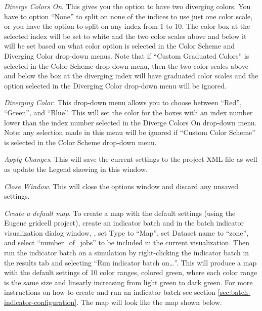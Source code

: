 \emph{Diverge Colors On}. This gives you the option to 
have two diverging colors. You have to option 
``None'' to split on none of the indices to use just one color scale, or 
you have the option to split on any index from 1 to 10. The color box at the 
selected index will be set to white and the two color scales above and 
below it will be set based on what color option is selected in the Color 
Scheme and Diverging Color drop-down menus. Note that if ``Custom Graduated Colors'' 
is selected in the Color Scheme drop-down menu, then the two color 
scales above and below the box at the diverging index will have graduated 
color scales and the option selected in the Diverging Color drop-down menu 
will be ignored.

\emph{Diverging Color}. This drop-down menu allows 
you to choose between ``Red'', ``Green'', and ``Blue''.  
This will set the color for the boxes with an index number lower than 
the index number selected in the Diverge Colors On drop-down menu.
Note: any selection made in this menu will be ignored if 
``Custom Color Scheme'' is selected in the Color Scheme drop-down menu.

\emph{Apply Changes}. This will save the current settings to 
the project XML file as well as update the Legend showing in this window.

\emph{Close Window}. This will close the options window and discard any unsaved settings.


\clearpage
{}

\emph{Create a default map}. To create a map with the default settings 
(using the Eugene gridcell project), create an indicator batch and 
in the batch indicator visualization dialog window, , set Type to 
``Map'', set Dataset name to ``zone'', and select ``number_of_jobs'' to be 
included in the current visualization.  Then run the indicator batch on 
a simulation by right-clicking the indicator batch in the results 
tab and selecting ``Run indicator batch on\ldots''. 
This will produce a map with the default 
settings of 10 color ranges, colored green, where each color range is 
the same size and linearly increasing from light green to dark green.
For more instructions on how to create and run an indicator batch see section
\ref{sec:batch-indicator-configuration}. The map will look like the 
map shown below.

